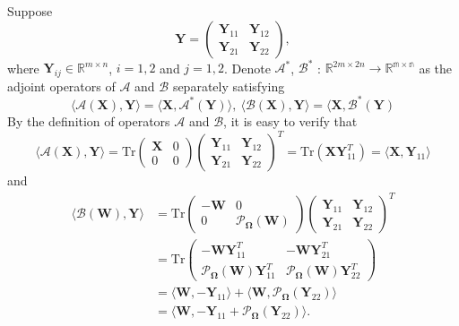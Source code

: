 \documentclass[fontset=windows]{article}
\begin{document}
{Suppose
\begin{equation*}
    \mathbf Y = \begin{pmatrix}
        \mathbf Y_{11} &\mathbf Y_{12} \\
        \mathbf Y_{21} &\mathbf Y_{22}
    \end{pmatrix},
\end{equation*}
where $\mathbf Y_{ij} \in \mathbb{R}^{m \times n}$, $i=1,2$ and $j=1,2$. Denote $\mathcal{A}^*$, $\mathcal{B}^*$ : $\mathbb{R}^{2m \times 2n} \rightarrow \mathbb{R^{m \times n}} $ as the adjoint operators of $\mathcal{A}$ and $\mathcal{B}$ separately satisfying 
\begin{equation}
    \langle \mathcal{A}(\mathbf X),\mathbf Y \rangle = \langle \mathbf X,\mathcal{A}^*(\mathbf Y) \rangle,\ \langle \mathcal{B}(\mathbf X),\mathbf Y \rangle =  \langle \mathbf X,\mathcal{B}^*(\mathbf Y)
    \label{adjopt}
\end{equation}
By the definition of operators $\mathcal{A}$ and $\mathcal{B}$, it is easy to verify that
\begin{equation*}
    \langle \mathcal{A}(\mathbf X),\mathbf Y \rangle = \text{Tr}\begin{pmatrix}
        \mathbf X & 0 \\
        0 & 0 
    \end{pmatrix}\begin{pmatrix}
        \mathbf Y_{11} & \mathbf Y_{12} \\
        \mathbf Y_{21} & \mathbf Y_{22}
    \end{pmatrix}^T = \text{Tr}(\mathbf X\mathbf Y_{11}^T) = \langle \mathbf X,\mathbf Y_{11} \rangle
\end{equation*}
and 
\begin{equation*}
    \begin{aligned}
        \langle \mathcal{B}(\mathbf W),\mathbf Y \rangle & = \text{Tr}\begin{pmatrix}
            -\mathbf W & 0 \\
            0 & \mathcal{P}_{\mathbf\Omega}(\mathbf W) 
        \end{pmatrix}\begin{pmatrix}
            \mathbf Y_{11} & \mathbf Y_{12} \\
            \mathbf Y_{21} & \mathbf Y_{22}
        \end{pmatrix}^T \\
        & = \text{Tr}\begin{pmatrix}
            -\mathbf W\mathbf Y_{11}^T & -\mathbf W\mathbf Y_{21}^T \\
            \mathcal{P}_{\mathbf\Omega}(\mathbf W)\mathbf Y_{11}^T & \mathcal{P}_{\mathbf\Omega}(\mathbf W)\mathbf Y_{22}^T
        \end{pmatrix}\\
        &= \langle\mathbf W, -\mathbf Y_{11} \rangle + \langle\mathbf W, \mathcal{P}_{\mathbf\Omega}(\mathbf Y_{22}) \rangle \\
        & = \langle\mathbf W, -\mathbf Y_{11}+ \mathcal{P}_{\mathbf\Omega}(\mathbf Y_{22})  \rangle.
    \end{aligned}
\end{equation*}

}
\end{document}
